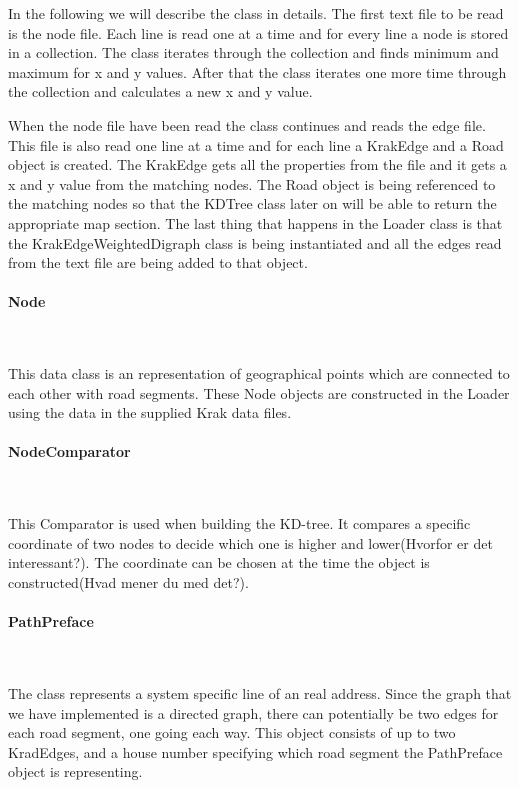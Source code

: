 \documentclass[a4paper,10pt,titlepage]{article}
\begin{document}
In the following we will describe the class in details. The first text file to be read is the node file. Each line is read one at a time and for every line a node is stored in a collection. The class iterates through the collection and finds minimum and maximum for x and y values. After that the class iterates one more time through the collection and calculates a new x and y value.  

When the node file have been read the class continues and reads the edge file. This file is also read one line at a time and for each line a KrakEdge and a Road object is created. The KrakEdge gets all the properties from the file and it gets a x and y value from the matching nodes. The Road object is being referenced to the matching nodes so that the KDTree class later on will be able to return the appropriate map section. The last thing that happens in the Loader class is that the KrakEdgeWeightedDigraph class is being instantiated and all the edges read from the text file are being added to that object. 

				\paragraph{Node}\mbox{}\
				
				This data class is an representation of geographical points which are connected to each other with road segments. These Node objects are constructed in the Loader using the data in the supplied Krak data files. 
				
				\paragraph{NodeComparator}\mbox{}\
				
This Comparator is used when building the KD-tree. It compares a specific coordinate of two nodes to decide which one is higher and lower(Hvorfor er det interessant?). The coordinate can be chosen at the time the object is constructed(Hvad mener du med det?).

				\paragraph{PathPreface}\mbox{}\
				
The class represents a system specific line of an real address. Since the graph that we have implemented is a directed graph, there can potentially be two edges for each road segment, one going each way. This object consists of up to two KradEdges, and a house number specifying which road segment the PathPreface object is representing.
\end{document}
